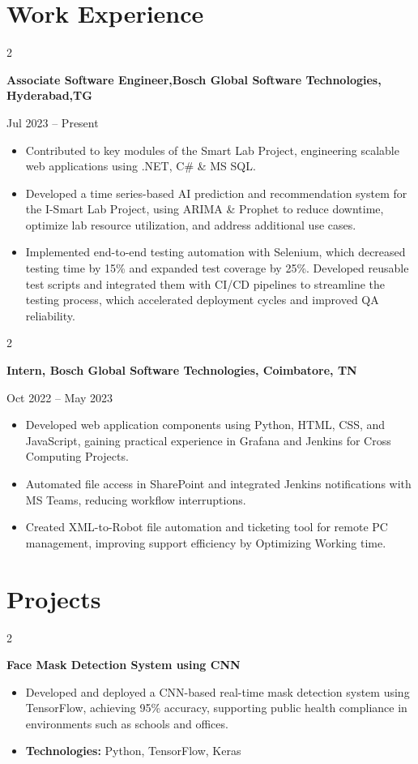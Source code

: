 \documentclass[10pt, letterpaper]{article}
\newenvironment{highlights}{
    \begin{itemize}[
        topsep=0.10 cm,
        parsep=0.10 cm,
        partopsep=0pt,
        itemsep=0pt,
        leftmargin=0 cm + 10pt
    ]
}{
    \end{itemize}
} %
\newenvironment{twocolentry}[2][]{
    \onecolentry
    \def\secondColumn{#2}
    \setcolumnwidth{\fill, 4.5 cm}
    \begin{paracol}{2}
}{
    \switchcolumn \raggedleft \secondColumn
    \end{paracol}
    \endonecolentry
} %
\begin{document}
    

\section{Work Experience}
\begin{twocolentry}{Jul 2023 – Present}
    \textbf{Associate Software Engineer,Bosch Global Software Technologies, Hyderabad,TG}
\end{twocolentry}
\begin{highlights}
    \item Contributed to key modules of the Smart Lab Project, engineering scalable web applications using .NET, C\# \& MS SQL.
    \item Developed a time series-based AI prediction and recommendation system for the I-Smart Lab Project, using ARIMA \& Prophet to reduce downtime, optimize lab resource utilization, and address additional use cases.
    \item Implemented end-to-end testing automation with Selenium, which decreased testing time by 15\% and expanded test coverage by 25\%. Developed reusable test scripts and integrated them with CI/CD pipelines to streamline the testing process, which accelerated deployment cycles and improved QA reliability. 

\end{highlights}
\begin{twocolentry}{Oct 2022 – May 2023}
    \textbf{Intern, Bosch Global Software Technologies, Coimbatore, TN}
\end{twocolentry}
\begin{highlights}
    \item Developed web application components using Python, HTML, CSS, and JavaScript, gaining practical experience in Grafana and Jenkins for Cross Computing Projects. 
    \item Automated file access in SharePoint and integrated Jenkins notifications with MS Teams, reducing workflow interruptions.
    \item Created XML-to-Robot file automation and ticketing tool for remote PC management, improving support efficiency by Optimizing Working time.
\end{highlights}


\section{Projects}

\begin{twocolentry}{}
    \textbf{Face Mask Detection System using CNN}
\end{twocolentry}
\begin{highlights}
    \item Developed and deployed a CNN-based real-time mask detection system using TensorFlow, achieving 95\% accuracy, supporting public health compliance in environments such as schools and offices. 
    \item \textbf{Technologies:} Python, TensorFlow, Keras
\end{highlights}
\end{document}
